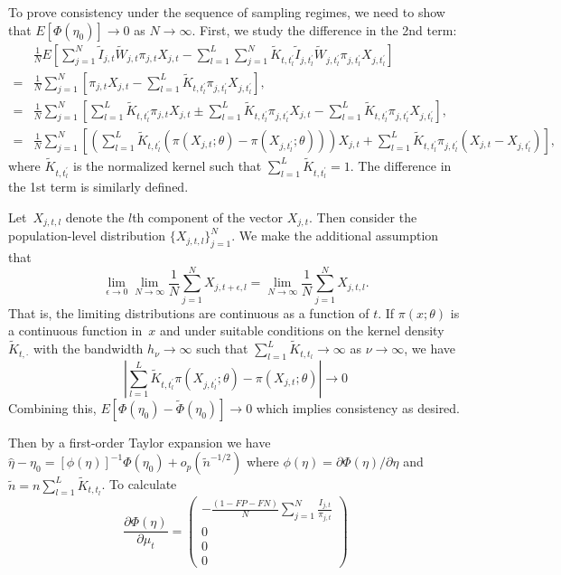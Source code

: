 \documentclass[11pt]{amsart}
\numberwithin{equation}{section}
\theoremstyle{plain}
\begin{document}
To prove consistency under the sequence of sampling regimes, we need to show that $E[ \Phi (\eta_0) ] \to 0$ as $N \to \infty$.  First, we study the difference in the 2nd term:
\begin{align*}
&\frac{1}{N}  E \left[ \sum_{j = 1}^N \tilde I_{j,t} \tilde W_{j,t}  \pi_{j,t} X_{j,t} - \sum_{l=1}^L  \sum_{j = 1}^N \tilde K_{t,t^\prime_l} \tilde I_{j,t^\prime_l} \tilde W_{j,t^\prime_l}  \pi_{j,t^\prime_l} X_{j,t^\prime_l} \right] \\
= &\frac{1}{N} \sum_{j = 1}^N \left[ \pi_{j,t} X_{j,t} - \sum_{l=1}^L \tilde K_{t,t^\prime_l} \pi_{j,t^\prime_l} X_{j,t^\prime_l} \right], \\
= &\frac{1}{N} \sum_{j = 1}^N \left[ \sum_{l=1}^L \tilde K_{t,t^\prime_l} \pi_{j,t} X_{j,t} \pm \sum_{l=1}^L \tilde K_{t,t^\prime_l} \pi_{j,t_l^\prime} X_{j,t}  - \sum_{l=1}^L \tilde K_{t,t^\prime_l} \pi_{j,t^\prime_l} X_{j,t^\prime_l} \right], \\
= &\frac{1}{N} \sum_{j = 1}^N \left[ \left( \sum_{l=1}^L \tilde K_{t,t^\prime_l}  \left( \pi (X_{j,t}; \theta) - \pi (X_{j,t^\prime_l}; \theta) \right) \right) X_{j,t} + \sum_{l=1}^L \tilde K_{t,t^\prime_l} \pi_{j,t^\prime_l} (X_{j,t} - X_{j,t^\prime_l} ) \right],
\end{align*}
where $\tilde K_{t, t^\prime_l}$ is the normalized kernel such that $\sum_{l=1}^L \tilde K_{t, t^\prime_l} = 1$. The difference in the 1st term is similarly defined.

Let~$X_{j,t,l}$ denote the $l$th component of the vector $X_{j,t}$.  Then consider the population-level distribution $\{ X_{j,t,l} \}_{j=1}^N$.  We make the additional assumption that
$$
\lim_{\epsilon \to 0} \lim_{N \to \infty} \frac{1}{N} \sum_{j=1}^N X_{j,t+\epsilon, l}  = \lim_{N \to \infty} \frac{1}{N} \sum_{j=1}^N X_{j,t, l}.
$$
That is, the limiting distributions are continuous as a function of $t$. If $\pi(x; \theta)$ is a continuous function in~$x$ and under suitable conditions on the kernel density~$\tilde K_{t, \cdot}$ with the bandwidth $h_\nu \to \infty$ such that $\sum_{l=1}^L \tilde K_{t,t_l} \to \infty$ as $\nu \to \infty$, we have
$$
\left | \sum_{l=1}^L \tilde K_{t, t_l^\prime} \pi (X_{j, t_l^\prime}; \theta) - \pi (X_{j, t}; \theta) \right|  \to 0
$$
Combining this, $E \left[ \Phi(\eta_0)  - \tilde \Phi (\eta_0) \right] \to 0$ which implies consistency as desired.

Then by a first-order Taylor expansion we have $\hat \eta - \eta_0 = \left[ \phi (\eta) \right]^{-1} \Phi(\eta_0) + o_p (\tilde n^{-1/2})$ where $\phi(\eta) = \partial \Phi (\eta)/\partial \eta$ and $\tilde n = n \sum_{l=1}^L \tilde K_{t,t_l}$.  To calculate
$$
\frac{\partial \Phi (\eta)}{\partial \mu_t} =
\left (
\begin{array}{c}
-\frac{(1-FP-FN)}{N} \sum_{j=1}^N \frac{I_{j,t}}{\pi_{j,t}} \\
0 \\
0 \\
0
\end{array}
\right )
$$
\end{document}
